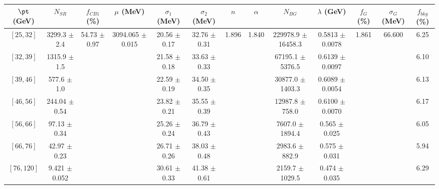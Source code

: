 \begin{tabular}{c||c|c|c|c|c|c|c|c|c|c|c||c}
$\pt$ (GeV) & $N_{SR}$ & $f_{CB1}$ (\%) & $\mu$ (MeV) & $\sigma_1$ (MeV) & $\sigma_2$ (MeV) & $n$ & $\alpha$ & $N_{BG}$ & $\lambda$ (GeV) & $f_G$ (\%) & $\sigma_G$ (MeV) & $f_{bkg}$ (\%) \\
\hline
$[25, 32]$ & 3299.3 $\pm$ 2.4 & \multirow{7}{*}{54.73 $\pm$ 0.97} & \multirow{7}{*}{3094.065 $\pm$ 0.015} & 20.56 $\pm$ 0.17 & 32.76 $\pm$ 0.31 & \multirow{7}{*}{1.896} & \multirow{7}{*}{1.840} & 229978.9 $\pm$ 16458.3 & 0.5813 $\pm$ 0.0078 & \multirow{7}{*}{1.861} & \multirow{7}{*}{66.600} & 6.25\\
$[32, 39]$ & 1315.9 $\pm$ 1.5 &  &  & 21.58 $\pm$ 0.18 & 33.63 $\pm$ 0.33 &  &  & 67195.1 $\pm$ 5376.5 & 0.6139 $\pm$ 0.0097 &  &  & 6.10\\
$[39, 46]$ & 577.6 $\pm$ 1.0 &  &  & 22.59 $\pm$ 0.19 & 34.50 $\pm$ 0.35 &  &  & 30877.0 $\pm$ 1403.3 & 0.6089 $\pm$ 0.0054 &  &  & 6.13\\
$[46, 56]$ & 244.04 $\pm$ 0.54 &  &  & 23.82 $\pm$ 0.21 & 35.55 $\pm$ 0.39 &  &  & 12987.8 $\pm$ 758.0 & 0.6100 $\pm$ 0.0070 &  &  & 6.17\\
$[56, 66]$ & 97.13 $\pm$ 0.34 &  &  & 25.26 $\pm$ 0.24 & 36.79 $\pm$ 0.43 &  &  & 7607.0 $\pm$ 1894.4 & 0.565 $\pm$ 0.025 &  &  & 6.05\\
$[66, 76]$ & 42.97 $\pm$ 0.23 &  &  & 26.71 $\pm$ 0.26 & 38.03 $\pm$ 0.48 &  &  & 2983.6 $\pm$ 882.9 & 0.575 $\pm$ 0.031 &  &  & 5.94\\
$[76, 120]$ & 9.421 $\pm$ 0.052 &  &  & 30.61 $\pm$ 0.33 & 41.38 $\pm$ 0.61 &  &  & 2159.7 $\pm$ 1029.5 & 0.474 $\pm$ 0.035 &  &  & 6.29\\
\end{tabular}
